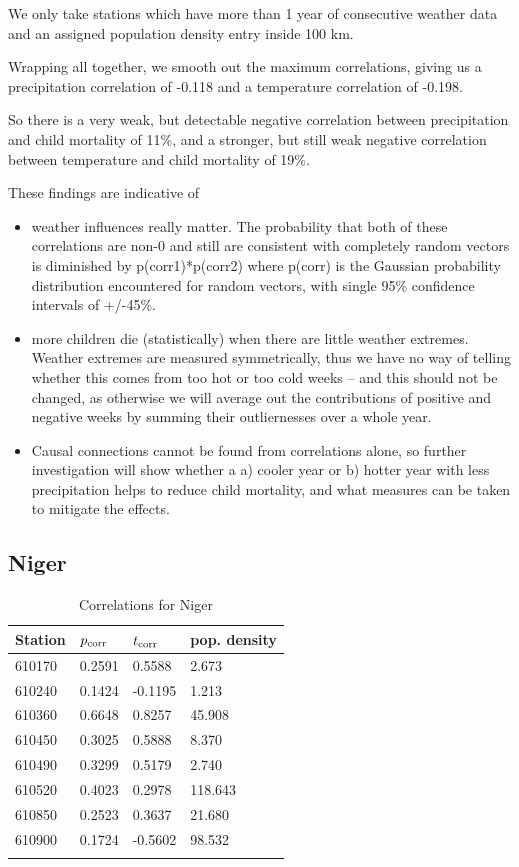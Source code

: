 \documentclass[
10pt, %
a4paper, %
oneside, %
headinclude,footinclude, %
useAMS,
usenatbib
]{template/mn2e}  %
\begin{document}
We only take stations which have more than 1 year of consecutive weather data and an assigned population density entry inside 100 km.

Wrapping all together, we smooth out the maximum correlations, giving us a precipitation correlation of -0.118 and a temperature correlation of -0.198.

So there is a very weak, but detectable negative correlation between precipitation and child mortality of 11\%, and a stronger, but still weak negative correlation between temperature and child mortality of 19\%.

These findings are indicative of
\begin{itemize}
\item weather influences really matter. The probability that both of these
  correlations are non-0 and still are consistent with completely
  random vectors is diminished by p(corr1)*p(corr2) where p(corr) is
  the Gaussian probability distribution encountered for random
  vectors, with single 95\% confidence intervals of +/-45\%.
\item more children die (statistically) when there are little weather
  extremes. Weather extremes are measured symmetrically, thus we have
  no way of telling whether this comes from too hot or too cold weeks
  -- and this should not be changed, as otherwise we will average out the
  contributions of positive and negative weeks by summing their
  outliernesses over a whole year.
\item Causal connections cannot be found from correlations alone, so
  further investigation will show whether a a) cooler year or b)
  hotter year with less precipitation helps to reduce child mortality,
  and what measures can be taken to mitigate the effects.
\end{itemize}

\subsection{Niger}
\begin{table}
    \caption{Correlations for Niger}
    \begin{tabular}{ l l l l }
        \hline\hline
        Station & $p_{\rm corr}$ & $t_{\rm corr}$ & pop. density\\
        \hline
        610170 & 0.2591 &  0.5588 &  2.673 \\
        610240 & 0.1424 & -0.1195 &  1.213 \\
        610360 & 0.6648 &  0.8257 & 45.908 \\
        610450 & 0.3025 &  0.5888 &  8.370 \\
        610490 & 0.3299 &  0.5179 &  2.740 \\
        610520 & 0.4023 &  0.2978 &118.643 \\
        610850 & 0.2523 &  0.3637 & 21.680 \\
        610900 & 0.1724 & -0.5602 & 98.532 \\
        \hline
        \label{tab:NR}
    \end{tabular}
\end{table}
\end{document}
